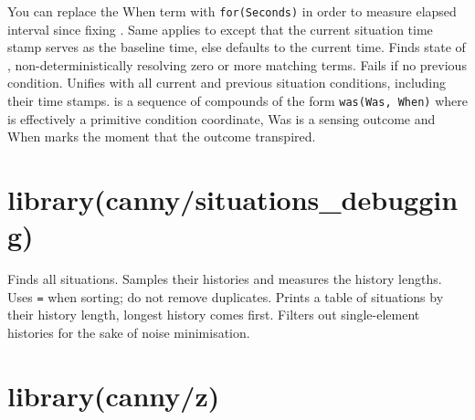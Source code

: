 \begin{description}
\begin{description}
You can replace the When term with \verb$for(Seconds)$ in order to
measure elapsed interval since fixing . Same applies to
 except that the current situation time stamp serves
as the baseline time, else defaults to the current time.
Finds  state of , non-deterministically
resolving zero or more matching  terms. Fails if no
previous  condition.
Unifies  with all current and previous situation
conditions, including their time stamps.  is a sequence
of compounds of the form \verb$was(Was, When)$ where  is
effectively a primitive condition coordinate, Was is a sensing
outcome and When marks the moment that the outcome transpired.
\end{description}
\end{description}

\chapter{library(canny/situations_debugging)}\label{sec:situationsdebugging}

\begin{description}
Finds all situations. Samples their histories and measures the
history lengths. Uses \verb$=$ when sorting; do not remove duplicates.
Prints a table of situations by their history length, longest
history comes first. Filters out single-element histories for the
sake of noise minimisation.
\end{description}

\chapter{library(canny/z)}\label{sec:z}

